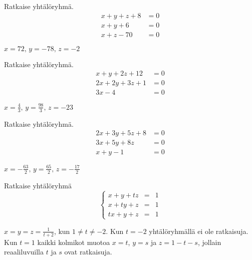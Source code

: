 \begin{tehtavasivu}
\begin{tehtava}
    Ratkaise yhtälöryhmä.
    \begin{align*}
        x+y+z+8 &= 0 \\
        x+y+6 &=0 \\
        x+z-70 &=0
    \end{align*}
    \begin{vastaus}
        $x = 72, \, y = -78, \, z = -2$
    \end{vastaus}
\end{tehtava}

\begin{tehtava}
    Ratkaise yhtälöryhmä.
    \begin{align*}
        x+y+2z+12 &= 0 \\
        2x+2y+3z+1 &=0 \\
        3x-4 &=0
    \end{align*}
    \begin{vastaus}
        $x = \frac{4}{3}, \, y = \frac{98}{3}, \, z = -23$
    \end{vastaus}
\end{tehtava}

\begin{tehtava}
    Ratkaise yhtälöryhmä.
    \begin{align*}
        2x+3y+5z+8 &= 0 \\
        3x+5y+8z &=0 \\
        x+y-1 &=0
    \end{align*}
    \begin{vastaus}
        $x = -\frac{63}{2}, \, y = \frac{65}{2}, \, z = -\frac{17}{2}$
    \end{vastaus}
\end{tehtava}

\begin{tehtava}
Ratkaise yhtälöryhmä
\[
\left\{    
    \begin{array}{rcl}
        x+y+tz &=&1 \\
        x+ty+z &=&1 \\
        tx+y+z &=&1
    \end{array}
    \right.
\]
\begin{vastaus}
$x = y = z = \frac{1}{t+2}$, kun $1 \neq t \neq -2$. Kun $t = -2$ yhtälöryhmällä ei ole ratkaisuja. Kun $t = 1$ kaikki kolmikot muotoa $x = t$, $y = s$ ja $z = 1-t-s$, jollain reaaliluvuilla $t$ ja $s$ ovat ratkaisuja.
\end{vastaus}
\end{tehtava}

\end{tehtavasivu}
